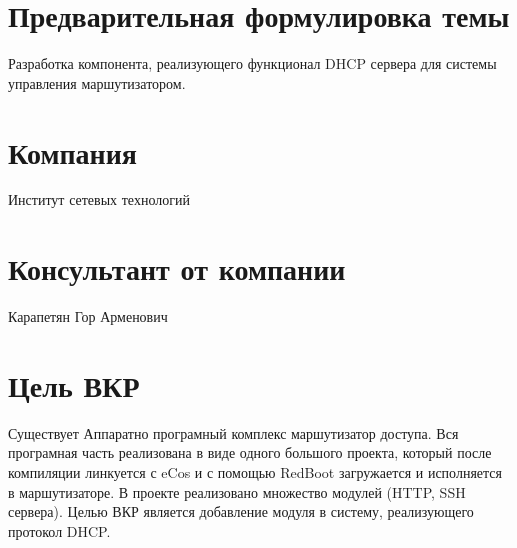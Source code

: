 \documentclass[12pt]{article}
\begin{document}

\section{Предварительная формулировка темы}
Разработка компонента, реализующего функционал DHCP сервера для системы управления маршутизатором.

\section{Компания}
Институт сетевых технологий

\section{Консультант от компании}
Карапетян Гор Арменович

\section{Цель ВКР}
Существует Аппаратно програмный комплекс маршутизатор доступа. Вся програмная часть реализована в виде одного большого проекта, который после компиляции линкуется с eCos и с помощью RedBoot загружается и исполняется в маршутизаторе. В проекте реализовано множество модулей (HTTP, SSH сервера). Целью ВКР является добавление модуля в систему, реализующего протокол DHCP.

\end{document}
